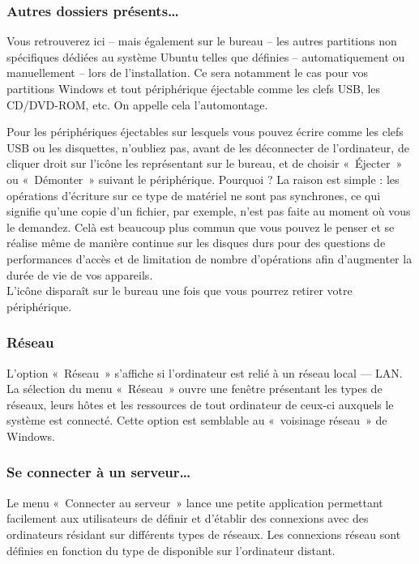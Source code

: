 \subsubsection{Autres dossiers présents\ldots{}}
\label{AutrePartitions}
Vous retrouverez ici -- mais également sur le bureau -- les autres partitions non spécifiques dédiées au système Ubuntu telles que définies -- automatiquement ou manuellement -- lors de l'installation. Ce sera notamment le cas pour vos partitions Windows et tout périphérique éjectable comme les clefs USB, les CD/DVD-ROM, etc. On appelle cela l'automontage.\par
Pour les périphériques éjectables sur lesquels vous pouvez écrire comme les clefs USB ou les disquettes, n'oubliez pas, avant de les déconnecter de l'ordinateur, de cliquer droit sur l'icône les représentant sur le bureau, et de choisir «~Éjecter~» ou «~Démonter~» suivant le périphérique. Pourquoi ? La raison est simple : les opérations d'écriture sur ce type de matériel ne sont pas synchrones, ce qui signifie qu'une copie d'un fichier, par exemple, n'est pas faite au moment où vous le demandez. Celà est beaucoup plus commun que vous pouvez le penser et se réalise même de manière continue sur les disques durs pour des questions de performances d'accès et de limitation de nombre d'opérations afin d'augmenter la durée de vie de vos appareils.\\
L'icône disparaît sur le bureau une fois que vous pourrez retirer votre périphérique.
\subsubsection{Réseau}
L'option «~Réseau~» s'affiche si l'ordinateur est relié à un réseau local --- LAN. La sélection du menu «~Réseau~» ouvre une fenêtre présentant les types de réseaux, leurs hôtes et les ressources de tout ordinateur de ceux-ci auxquels le système est connecté. Cette option est semblable au «~voisinage réseau~» de Windows.
\subsubsection{Se connecter à un serveur\ldots{}}
Le menu «~Connecter au serveur~» lance une petite application permettant facilement aux utilisateurs de définir et d'établir des connexions avec des ordinateurs résidant sur différents types de réseaux. Les connexions réseau sont définies en fonction du type de  disponible sur l'ordinateur distant. 
